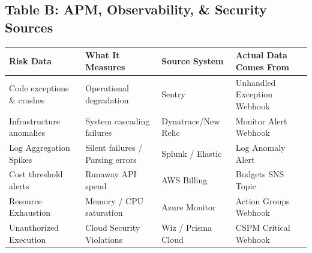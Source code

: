 \documentclass[11pt,a4paper]{article}
\begin{document}
\subsection{Table B: APM, Observability, \& Security Sources}
\begin{table}[H]
\centering
\renewcommand{\arraystretch}{1.4}
\small
{}
\begin{tabularx}{\textwidth}{| >{\raggedright\arraybackslash}X >{\raggedright\arraybackslash}X >{\raggedright\arraybackslash}p{3cm} >{\raggedright\arraybackslash}X |}
\hline
\rowcolor{dpicloud!30} \textbf{Risk Data} & \textbf{What It Measures} & \textbf{Source System} & \textbf{Actual Data Comes From} \\
\hline
Code exceptions \& crashes & Operational degradation & Sentry & Unhandled Exception Webhook \\
Infrastructure anomalies & System cascading failures & Dynatrace/New Relic & Monitor Alert Webhook \\
Log Aggregation Spikes & Silent failures / Parsing errors & Splunk / Elastic & Log Anomaly Alert \\
Cost threshold alerts & Runaway API spend & AWS Billing & Budgets SNS Topic \\
Resource Exhaustion & Memory / CPU saturation & Azure Monitor & Action Groups Webhook \\
Unauthorized Execution & Cloud Security Violations & Wiz / Prisma Cloud & CSPM Critical Webhook \\
\hline
\end{tabularx}
\end{table}
\end{document}

